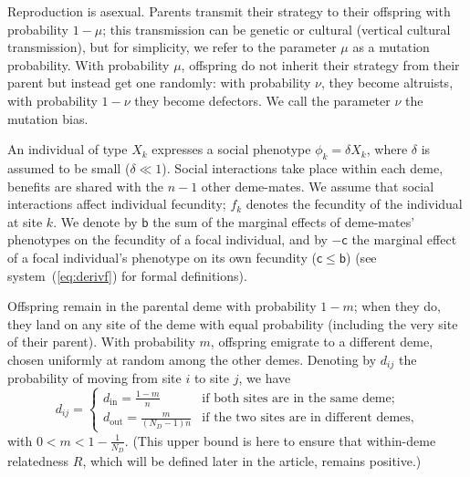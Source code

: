 \documentclass[11pt, letterpaper]{article}
\newcommand{\sysref}[1]{system~(\ref{#1})}
\newcommand{\bigO}[1]{O\left( #1 \right)}
\newcommand{\bb}{\mathsf{b}}
\newcommand{\cc}{\mathsf{c}}
\newcommand{\mutbias}{\nu}
\newcommand{\inn}{\textrm{in}}
\newcommand{\out}{\textrm{out}}
\newcommand{\din}{d_{\inn}}
\newcommand{\dout}{d_{\out}}
\newcommand{\ndemes}{N_D}
\newcommand{\selstr}{\delta}
\begin{document}
Reproduction is asexual. Parents transmit their strategy to their offspring with probability $1-\mu$; this transmission can be genetic or cultural (vertical cultural transmission), but for simplicity, we refer to the parameter $\mu$ as a mutation probability. With probability $\mu$, offspring do not inherit their strategy from their parent but instead get one randomly: with probability $\mutbias$, they become altruists, with probability $1-\mutbias$ they become defectors. We call the parameter $\mutbias$ the mutation bias. 

An individual of type $X_k$ expresses a social phenotype $\phi_k = \selstr X_k$, where $\selstr$ is assumed to be small ($\selstr \ll 1$). Social interactions take place within each deme, benefits are shared with the $n-1$ other deme-mates. We assume that social interactions affect individual fecundity; $f_k$ denotes the fecundity of the individual at site $k$. We denote by $\bb$ the sum of the marginal effects of deme-mates' phenotypes on the fecundity of a focal individual, and by $-\cc$ the marginal effect of a focal individual's phenotype on its own fecundity ($\cc \leq \bb$) (see \sysref{eq:derivf} for formal definitions). %

Offspring remain in the parental deme with probability $1-m$; when they do, they land on any site of the deme with equal probability (including the very site of their parent). With probability $m$, offspring emigrate to a different deme, chosen uniformly at random among the other demes. Denoting by $d_{ij}$ the probability of moving from site $i$ to site $j$, we have
\begin{equation}\label{eq:defD}
d_{ij} = \begin{cases}
 \din =  \frac{1-m}{n} & \textrm{if both sites are in the same deme;}\\
 \dout = \frac{m}{(\ndemes-1) n} & \textrm{if the two sites are in different demes,} 
\end{cases}
\end{equation}
%
with $0 < m < 1-\frac{1}{\ndemes}$. (This upper bound is here to ensure that within-deme relatedness $R$, which will be defined later in the article, remains positive.)
\end{document}
